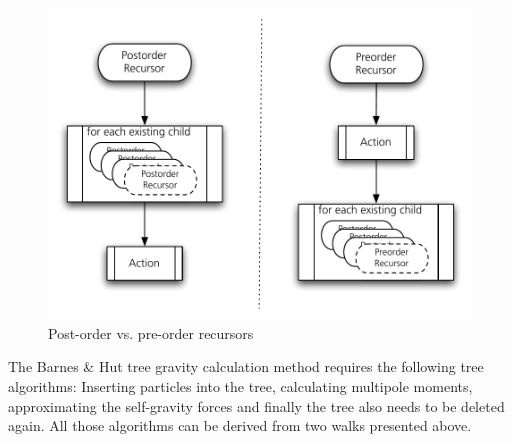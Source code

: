 \begin{figure}[htbp]
\begin{center}
\includegraphics[scale=0.6]{12orderwalks.pdf}
\caption{Post-order vs. pre-order recursors}
\label{ch02_grav02_fig05}
\end{center}
\end{figure}

The Barnes \& Hut tree gravity calculation method requires the following tree algorithms: Inserting particles into the tree, calculating multipole moments, approximating the self-gravity forces and finally the tree also needs to be deleted again. All those algorithms can be derived from two walks presented above.

